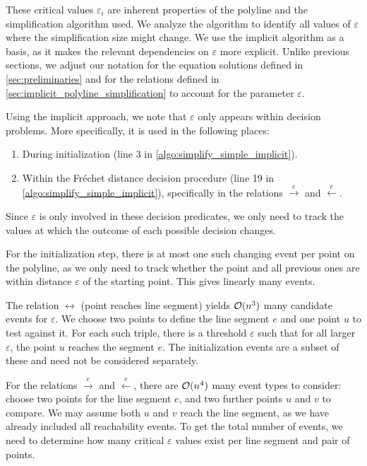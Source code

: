 These critical values \(\varepsilon_i\) are inherent properties of the polyline and the simplification algorithm used. We analyze the \citeauthor{on_optimal_polyline_simplification_using_the_hausdorff_and_frechet_distance} algorithm to identify all values of \(\varepsilon\) where the simplification size might change. We use the implicit algorithm as a basis, as it makes the relevant dependencies on \(\varepsilon\) more explicit. Unlike previous sections, we adjust our notation for the equation solutions defined in \cref{sec:preliminaries} and for the relations defined in \cref{sec:implicit_polyline_simplification} to account for the parameter \(\varepsilon\).

Using the implicit approach, we note that \(\varepsilon\) only appears within decision problems. More specifically, it is used in the following places:
\begin{enumerate}
  \item During initialization (line 3 in \cref{algo:simplify_simple_implicit}).
	\item Within the Fréchet distance decision procedure (line 19 in \cref{algo:simplify_simple_implicit}), specifically in the relations \(\overset e\rightarrow\) and \(\overset e\leftarrow\).
\end{enumerate}

Since \(\varepsilon\) is only involved in these decision predicates, we only need to track the values at which the outcome of each possible decision changes.

For the initialization step, there is at most one such changing event per point on the polyline, as we only need to track whether the point and all previous ones are within distance \(\varepsilon\) of the starting point. This gives linearly many events.

The relation \(\leftrightarrow\) (point reaches line segment) yields \(\mathcal{O}(n^3)\) many candidate events for \(\varepsilon\). We choose two points to define the line segment \(e\) and one point \(u\) to test against it. For each such triple, there is a threshold \(\varepsilon\) such that for all larger \(\varepsilon\), the point \(u\) reaches the segment \(e\). The initialization events are a subset of these and need not be considered separately.

For the relations \(\overset e\rightarrow\) and \(\overset e\leftarrow\), there are \(\mathcal{O}(n^4)\) many event types to consider: choose two points for the line segment \(e\), and two further points \(u\) and \(v\) to compare. We may assume both \(u\) and \(v\) reach the line segment, as we have already included all reachability events. To get the total number of events, we need to determine how many critical \(\varepsilon\) values exist per line segment and pair of points.

